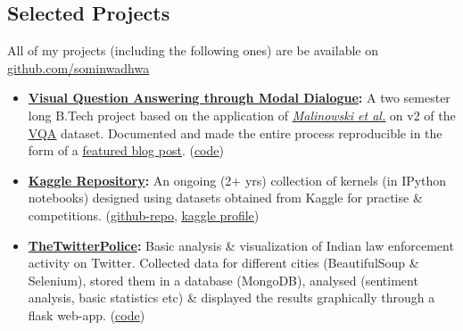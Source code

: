 \documentclass[margin,line]{res}
\begin{document}
\begin{resume}
\section{\sc Selected Projects}
All of my projects (including the following ones) are be available on {\href{https://github.com/sominwadhwa}{github.com/sominwadhwa}}\\
\begin{itemize}[leftmargin=*]
\item {\bf {\href{https://github.com/sominwadhwa/vqamd_floyd}{Visual Question Answering through Modal Dialogue}:}}
A two semester long B.Tech project based on the application of \textit{\href{https://arxiv.org/pdf/1505.01121.pdf}{\underline{Malinowski et al.}}} on v2 of the {\href{http://visualqa.org/}{\underline{VQA}}} dataset. Documented and made the entire process reproducible in the form of a \href{https://blog.floydhub.com/asking-questions-to-images-with-deep-learning/}{\underline{featured blog post}}. ({\href{https://github.com/sominwadhwa/vqamd_floyd}{\underline{code}}})
\item {\bf {\href{https://github.com/sominwadhwa/Kaggle}{Kaggle Repository}:}}
An ongoing (2+ yrs) collection of kernels (in IPython notebooks) designed using datasets obtained from Kaggle for practise \& competitions. ({\href{https://github.com/sominwadhwa/Kaggle}{\underline{github-repo}}}, {\href{https://www.kaggle.com/sominwadhwa}{\underline{kaggle profile}}})
\item {\bf {\href{https://github.com/sominwadhwa/TheTwitterPolice}{TheTwitterPolice}:}}
Basic analysis \& visualization of Indian law enforcement activity on Twitter. Collected data for different cities (BeautifulSoup \& Selenium), stored them in a database (MongoDB), analysed (sentiment analysis, basic statistics etc) \& displayed the results graphically through a flask web-app. ({\href{https://github.com/sominwadhwa/TheTwitterPolice}{\underline{code}}})
\end{itemize}

\iffalse
\section{\sc Technical Skills}
{\bf Strongest Areas}: Machine Learning (Classification, Regression, Feature Engineering), Algorithms, Statistical Data Analysis\\
{\bf Languages/Tools/Software}: Python (scikit-learn, Keras, NumPy, Pandas \& others), Java, SQL, MongoDB, \LaTeX, MS Excel
\fi


\end{resume}
\end{document}
